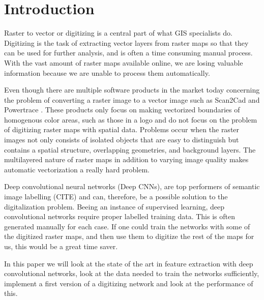 \chapter{Introduction}
Raster to vector or digitizing is a central part of what GIS specialists do. Digitizing is the task of extracting vector layers from raster maps so that they can be used for further analysis, and is often a time consuming manual process. With the vast amount of raster maps available online, we are losing valuable information because we are unable to process them automatically.

Even though there are multiple software products in the market today concerning the problem of converting a raster image to a vector image such as Scan2Cad \cite{scan2cad2009} and Powertrace \cite{powertrace2016}. These products only focus on making vectorized boundaries of homogenous color areas, such as those in a logo and do not focus on the problem of digitizing raster maps with spatial data. Problems occur when the raster images not only consists of isolated objects that are easy to distinguish but contains a spatial structure, overlapping geometries, and background layers. The multilayered nature of raster maps in addition to varying image quality makes automatic vectorization a really hard problem.

Deep convolutional neural networks (Deep CNNs), are top performers of semantic image labelling (CITE) and can, therefore, be a possible solution to the digitalization problem. Beeing an instance of supervised learning, deep convolutional networks require proper labelled training data. This is often generated manually for each case. If one could train the networks with some of the digitized raster maps, and then use them to digitize the rest of the maps for us, this would be a great time saver.

In this paper we will look at the state of the art in feature extraction with deep convolutional networks, look at the data needed to train the networks sufficiently, implement a first version of a digitizing network and look at the performance of this.

